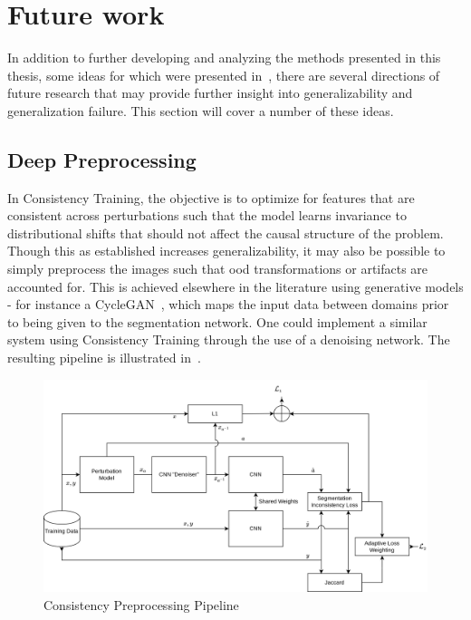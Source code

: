 \section{Future work} \label{future_work}
  In addition to further developing and analyzing the methods presented in this thesis, some ideas for which were presented in~, there are several directions of future research that may provide further insight into generalizability and generalization failure. This section will cover a number of these ideas. 
    \subsection{Deep Preprocessing} \label{denoising}
        In Consistency Training, the objective is to optimize for features that are consistent across perturbations such that the model learns invariance to distributional shifts that should not affect the causal structure of the problem. Though this as established increases generalizability, it may also be possible to simply preprocess the images such that \gls{ood} transformations or artifacts are accounted for. This is achieved elsewhere in the literature using generative models - for instance a CycleGAN~\cite{cyclegan}, which maps the input data between domains prior to being given to the segmentation network. One could implement a similar system using Consistency Training through the use of a denoising network. The resulting pipeline is illustrated in~.
        
        \begin{figure}[htb]
            \centering
           \includegraphics[width=\linewidth]{illustrations/deep_preprocessing.png}
            \caption{Consistency Preprocessing Pipeline}
            \label{fig:preproc}
        \end{figure}
        
